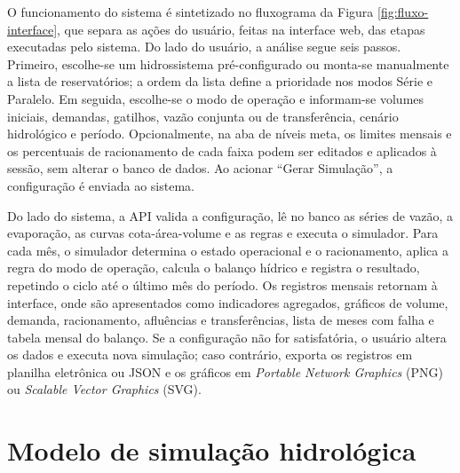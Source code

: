 O funcionamento do sistema é sintetizado no fluxograma da Figura \ref{fig:fluxo-interface}, que separa as ações do usuário, feitas na interface web, das etapas executadas pelo sistema. Do lado do usuário, a análise segue seis passos. Primeiro, escolhe-se um hidrossistema pré-configurado ou monta-se manualmente a lista de reservatórios; a ordem da lista define a prioridade nos modos Série e Paralelo. Em seguida, escolhe-se o modo de operação e informam-se volumes iniciais, demandas, gatilhos, vazão conjunta ou de transferência, cenário hidrológico e período. Opcionalmente, na aba de níveis meta, os limites mensais e os percentuais de racionamento de cada faixa podem ser editados e aplicados à sessão, sem alterar o banco de dados. Ao acionar ``Gerar Simulação'', a configuração é enviada ao sistema.

Do lado do sistema, a API valida a configuração, lê no banco as séries de vazão, a evaporação, as curvas cota-área-volume e as regras e executa o simulador. Para cada mês, o simulador determina o estado operacional e o racionamento, aplica a regra do modo de operação, calcula o balanço hídrico e registra o resultado, repetindo o ciclo até o último mês do período. Os registros mensais retornam à interface, onde são apresentados como indicadores agregados, gráficos de volume, demanda, racionamento, afluências e transferências, lista de meses com falha e tabela mensal do balanço. Se a configuração não for satisfatória, o usuário altera os dados e executa nova simulação; caso contrário, exporta os registros em planilha eletrônica ou JSON e os gráficos em \textit{Portable Network Graphics} (PNG) ou \textit{Scalable Vector Graphics} (SVG).

\begin{figure}[H]
    \centering
\end{figure}

\section{Modelo de simulação hidrológica}
\label{sec:modelo-simulacao}

